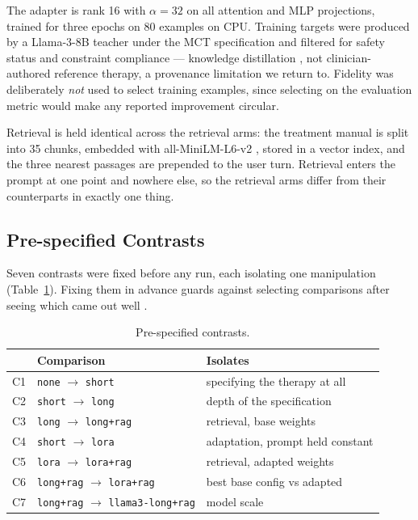 \documentclass[conference]{IEEEtran}
\begin{document}
The adapter is rank 16 with $\alpha=32$ on all attention and MLP projections,
trained for three epochs on 80 examples on CPU. Training targets were produced by
a Llama-3-8B teacher under the MCT specification and filtered for safety status
and constraint compliance --- knowledge distillation
\cite{hinton2015distillation}, not clinician-authored reference therapy, a
provenance limitation we return to. Fidelity was deliberately \emph{not} used to
select training examples, since selecting on the evaluation metric would make any
reported improvement circular.

Retrieval is held identical across the retrieval arms: the treatment manual is
split into 35 chunks, embedded with all-MiniLM-L6-v2
\cite{reimers2019sbert,wang2020minilm}, stored in a vector index, and the three
nearest passages are prepended to the user turn. Retrieval enters the prompt at
one point and nowhere else, so the retrieval arms differ from their counterparts
in exactly one thing.

\subsection{Pre-specified Contrasts}

Seven contrasts were fixed before any run, each isolating one manipulation
(Table~\ref{tab:contrasts}). Fixing them in advance guards against selecting
comparisons after seeing which came out well \cite{kerr1998harking}.

\begin{table}[t]
\caption{Pre-specified contrasts.}
\label{tab:contrasts}
\centering
\footnotesize
\begin{tabular}{@{}llp{3.5cm}@{}}
\toprule
 & \textbf{Comparison} & \textbf{Isolates} \\
\midrule
C1 & \texttt{none} $\to$ \texttt{short} & specifying the therapy at all \\
C2 & \texttt{short} $\to$ \texttt{long} & depth of the specification \\
C3 & \texttt{long} $\to$ \texttt{long+rag} & retrieval, base weights \\
C4 & \texttt{short} $\to$ \texttt{lora} & adaptation, prompt held constant \\
C5 & \texttt{lora} $\to$ \texttt{lora+rag} & retrieval, adapted weights \\
C6 & \texttt{long+rag} $\to$ \texttt{lora+rag} & best base config vs adapted \\
C7 & \texttt{long+rag} $\to$ \texttt{llama3-long+rag} & model scale \\
\bottomrule
\end{tabular}
\end{table}
\end{document}

